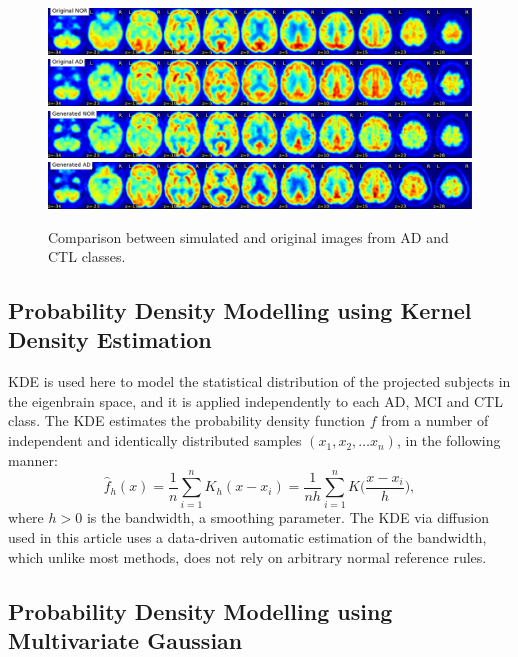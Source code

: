 \begin{figure}[!h]
	\centering
	\includegraphics[width=0.7\linewidth]{gfx/ch9/originalNOR}\\
	\includegraphics[width=0.7\linewidth]{gfx/ch9/originalAD}\\
	\includegraphics[width=0.7\linewidth]{gfx/ch9/generatedNOR}\\
	\includegraphics[width=0.7\linewidth]{gfx/ch9/generatedAD}
	\caption[Comparison between simulated and original images from \acs{AD} and \acs{CTL} classes.]{Comparison between simulated and original images from \ac{AD} and \ac{CTL} classes.}
	\label{fig:comparisonSimulation}
\end{figure}

\subsection{Probability Density Modelling using Kernel Density Estimation}
\ac{KDE} is used here to model the statistical distribution of the projected subjects in the eigenbrain space, and it is applied independently to each \ac{AD}, \ac{MCI} and \ac{CTL} class. The \ac{KDE} estimates the probability density function $f$ from a number of independent and identically distributed samples $(x_1, x_2, \dots x_n)$, in the following manner:
\begin{equation}
\hat{f}_h(x) = \frac{1}{n}\sum_{i=1}^n K_h (x - x_i) = \frac{1}{nh} \sum_{i=1}^n K\Big(\frac{x-x_i}{h}\Big),
\end{equation}
where $h>0$ is the bandwidth, a smoothing parameter. The \ac{KDE} via diffusion \cite{Botev2010} used in this article uses a data-driven automatic estimation of the bandwidth, which unlike most methods, does not rely on arbitrary normal reference rules. 

\subsection{Probability Density Modelling using Multivariate Gaussian}

